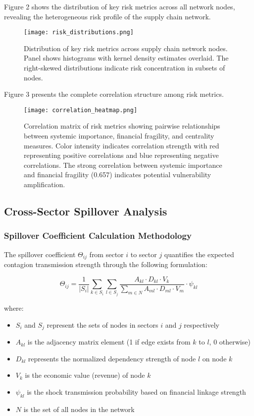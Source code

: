 \documentclass[a4 paper, 11pt,twoside]{article}
\newcommand{\0}{\Bf{0}}
\theoremstyle{definition}
\begin{document}
Figure 2 shows the distribution of key risk metrics across all network nodes, revealing the heterogeneous risk profile of the supply chain network.

\begin{figure}[H]
\centering
\texttt{[image: risk\_distributions.png]}
\caption{Distribution of key risk metrics across supply chain network nodes. Panel shows histograms with kernel density estimates overlaid. The right-skewed distributions indicate risk concentration in subsets of nodes.}
\end{figure}

Figure 3 presents the complete correlation structure among risk metrics.

\begin{figure}[H]
\centering
\texttt{[image: correlation\_heatmap.png]}
\caption{Correlation matrix of risk metrics showing pairwise relationships between systemic importance, financial fragility, and centrality measures. Color intensity indicates correlation strength with red representing positive correlations and blue representing negative correlations. The strong correlation between systemic importance and financial fragility (0.657) indicates potential vulnerability amplification.}
\end{figure}

\subsection{Cross-Sector Spillover Analysis}

\subsubsection{Spillover Coefficient Calculation Methodology}

The spillover coefficient $\Theta_{ij}$ from sector $i$ to sector $j$ quantifies the expected contagion transmission strength through the following formulation:

\begin{equation}
\Theta_{ij} = \frac{1}{|S_i|} \sum_{k \in S_i} \sum_{l \in S_j} \frac{A_{kl} \cdot D_{kl} \cdot V_k}{\sum_{m \in N} A_{ml} \cdot D_{ml} \cdot V_m} \cdot \psi_{kl}
\end{equation}

where:
\begin{itemize}
\item $S_i$ and $S_j$ represent the sets of nodes in sectors $i$ and $j$ respectively
\item $A_{kl}$ is the adjacency matrix element (1 if edge exists from $k$ to $l$, 0 otherwise)
\item $D_{kl}$ represents the normalized dependency strength of node $l$ on node $k$
\item $V_k$ is the economic value (revenue) of node $k$
\item $\psi_{kl}$ is the shock transmission probability based on financial linkage strength
\item $N$ is the set of all nodes in the network
\end{itemize}
\end{document}
